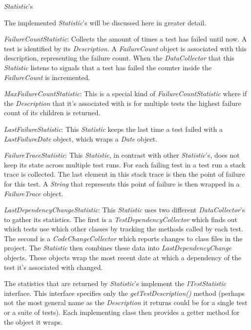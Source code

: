 \documentclass[i2]{oss}
\newcommand{\class}[1]{\emph{#1}}
\newcommand{\method}[1]{\emph{#1}}
\begin{document}
\class{Statistic}'s 

The implemented \class{Statistic}'s will be discussed here in greater 
detail.
\begin{description}
\item \class{FailureCountStatistic}: Collects the amount of times a test 
has failed until now.
A test is identified by its \class{Description}.
A \class{FailureCount} object is associated with this description,
representing the failure count.
When the \class{DataCollector} that this \class{Statistic} listens to
signals that a test has failed the counter inside the 
\class{FailureCount} is incremented.
\item \class{MaxFailureCountStatistic}: This is a special kind of 
\class{FailureCountStatistic} where if the \class{Description} that it's
associated with is for multiple tests the highest failure count of its 
children is returned.
\item \class{LastFailureStatistic}: This \class{Statistic} keeps the 
last time a test failed with a \class{LastFailureDate} object, which
wraps a \class{Date} object.
\item \class{FailureTraceStatistic}: This \class{Statistic}, in contrast
with other \class{Statistic}'s, does not keep its state across multiple
test runs.
For each failing test in a test run a stack trace is collected. 
The last element in this stack trace is then the point of failure for 
this test.
A \class{String} that represents this point of failure is then wrapped
in a \class{FailureTrace} object.
\item \class{LastDependencyChangeStatistic}: This \class{Statistic} uses
two different \class{DataCollector}'s to gather its statistics.
The first is a \class{TestDependencyCollector} which finds out which 
tests use which other classes by tracking the methods called by each
test.
The second is a \class{CodeChangeCollector} which reports changes to
class files in the project.
The \class{Statistic} then combines these data into 
\class{LastDependencyChange} objects.
These objects wrap the most recent date at which a dependency of the 
test it's associated with changed.
\end{description}

The statistics that are returned by \class{Statistic}'s implement the
\class{ITestStatistic} interface.
This interface specifies only the \method{getTestDescription()} method 
(perhaps not the most general name as the \class{Description} it returns
could be for a single test or a suite of tests).
Each implementing class then provides a getter method for the object it
wraps.
\end{document}

